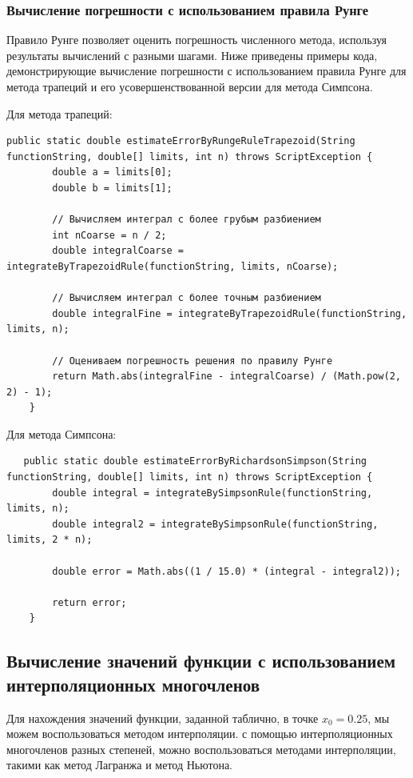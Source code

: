 \documentclass[12pt]{article}
\begin{document}
\subsubsection{Вычисление погрешности с использованием правила Рунге}

Правило Рунге позволяет оценить погрешность численного метода, используя результаты вычислений с разными шагами. Ниже приведены примеры кода, демонстрирующие вычисление погрешности с использованием правила Рунге для метода трапеций и его усовершенствованной версии для метода Симпсона.

Для метода трапеций:
\begin{verbatim}
public static double estimateErrorByRungeRuleTrapezoid(String functionString, double[] limits, int n) throws ScriptException {
        double a = limits[0];
        double b = limits[1];

        // Вычисляем интеграл с более грубым разбиением
        int nCoarse = n / 2;
        double integralCoarse = integrateByTrapezoidRule(functionString, limits, nCoarse);

        // Вычисляем интеграл с более точным разбиением
        double integralFine = integrateByTrapezoidRule(functionString, limits, n);

        // Оцениваем погрешность решения по правилу Рунге
        return Math.abs(integralFine - integralCoarse) / (Math.pow(2, 2) - 1);
    }
\end{verbatim}

Для метода Симпсона:
\begin{verbatim}
   public static double estimateErrorByRichardsonSimpson(String functionString, double[] limits, int n) throws ScriptException {
        double integral = integrateBySimpsonRule(functionString, limits, n);
        double integral2 = integrateBySimpsonRule(functionString, limits, 2 * n);

        double error = Math.abs((1 / 15.0) * (integral - integral2));

        return error;
    }
\end{verbatim}

\subsection{Вычисление значений функции с использованием интерполяционных многочленов}

Для нахождения значений функции, заданной таблично,   в точке $x_0=0.25$, мы можем воспользоваться методом интерполяции. с помощью интерполяционных многочленов разных степеней, можно воспользоваться методами интерполяции, такими как метод Лагранжа и метод Ньютона.
\end{document}
